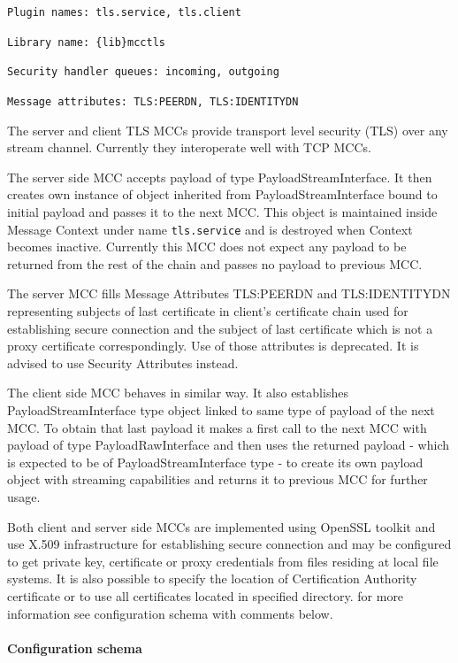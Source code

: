 \documentclass{book}
\begin{document}
\texttt{Plugin names: tls.service, tls.client}

\texttt{Library name: \{lib\}mcctls}

\texttt{Security handler queues: incoming, outgoing}

\texttt{Message attributes: TLS:PEERDN, TLS:IDENTITYDN}


The server and client TLS MCCs provide transport level security (TLS) over any stream channel. Currently they interoperate well with TCP MCCs.

The server side MCC accepts payload of type PayloadStreamInterface. It then creates own instance of object inherited from PayloadStreamInterface bound to initial payload and passes it to the next MCC. This object is maintained inside Message Context under name \texttt{tls.service} and is destroyed when Context becomes inactive. Currently this MCC does not expect any payload to be returned from the rest of the chain and passes no payload to previous MCC.

The server MCC fills Message Attributes TLS:PEERDN and TLS:IDENTITYDN representing subjects of last certificate in client's certificate chain used for establishing secure connection and the subject of last certificate which is not a proxy certificate correspondingly. Use of those attributes is deprecated. It is advised to use Security Attributes instead.

The client side MCC behaves in similar way. It also establishes PayloadStreamInterface type object linked to same type of payload of the next MCC. To obtain that last payload it makes a first call to the next MCC with payload of type PayloadRawInterface and then uses the returned payload - which is expected to be of PayloadStreamInterface type - to create its own payload object with streaming capabilities and returns it to previous MCC for further usage.

Both client and server side MCCs are implemented using OpenSSL toolkit \cite{openssl} and use X.509 infrastructure \cite{x509} for establishing secure connection and may be configured to get private key, certificate or proxy credentials from files residing at local file systems. It is also possible to specify the location of Certification Authority certificate or to use all certificates located in specified directory. for more information see configuration schema with comments below.


\paragraph{Configuration schema}
\end{document}

